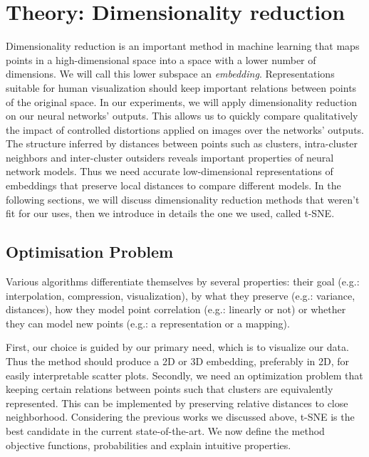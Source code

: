 \documentclass[a4paper,12pt]{report}
\newcommand{\eg}{e.g.}
\begin{document}
\chapter{Theory: Dimensionality reduction}
\label{chap:dim_red}
Dimensionality reduction is an important method in machine learning that maps points in a high-dimensional space into a space with a lower number of dimensions.
We will call this lower subspace an {\em embedding}.
Representations suitable for human visualization should keep important relations between points of the original space.
In our experiments, we will apply dimensionality reduction on our neural networks' outputs.
This allows us to quickly compare qualitatively the impact of controlled distortions applied on images over the networks' outputs.
The structure inferred by distances between points such as clusters, intra-cluster neighbors and inter-cluster outsiders reveals important properties of neural network models.
Thus we need accurate low-dimensional representations of embeddings that preserve local distances to compare different models.
In the following sections, we will discuss dimensionality reduction methods that weren't fit for our uses, then we introduce in details the one we used, called t-SNE.

\section{Optimisation Problem}
Various algorithms differentiate themselves by several properties: their goal (\eg: interpolation, compression, visualization), by what they preserve (\eg: variance, distances), how they model point correlation (\eg: linearly or not) or whether they can model new points (\eg: a representation or a mapping).

First, our choice is guided by our primary need, which is to visualize our data.
Thus the method should produce a 2D or 3D embedding, preferably in 2D, for easily interpretable scatter plots.
Secondly, we need an optimization problem that keeping certain relations between points such that clusters are equivalently represented.
This can be implemented by preserving relative distances to close neighborhood.
Considering the previous works we discussed above, t-SNE is the best candidate in the current state-of-the-art.
We now define the method objective functions, probabilities and explain intuitive properties.
\end{document}
